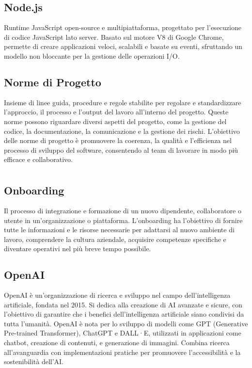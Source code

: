 \subsection*{Node.js}
Runtime JavaScript open-source e multipiattaforma, progettato per l'esecuzione di codice JavaScript lato server. Basato sul motore V8 di Google Chrome, 
permette di creare applicazioni veloci, scalabili e basate su eventi, sfruttando un modello non bloccante per la gestione delle operazioni I/O.

\subsection*{Norme di Progetto}
Insieme di linee guida, procedure e regole stabilite per regolare e standardizzare l’approccio, il processo e l’output del lavoro all’interno del progetto. 
Queste norme possono riguardare diversi aspetti del progetto, come la gestione del codice, la documentazione, la comunicazione e la gestione dei rischi. 
L’obiettivo delle norme di progetto è promuovere la coerenza, la qualità e l’efficienza nel processo di sviluppo del software, consentendo al team di 
lavorare in modo più efficace e collaborativo.

\newpage



\section{}

\hypertarget{sec:onboarding}{}
\subsection*{Onboarding}
Il processo di integrazione e formazione di un nuovo dipendente, collaboratore o utente in un'organizzazione o piattaforma. L'onboarding ha l'obiettivo di 
fornire tutte le informazioni e le risorse necessarie per adattarsi al nuovo ambiente di lavoro, comprendere la cultura aziendale, acquisire competenze 
specifiche e diventare operativi nel più breve tempo possibile. 

\hypertarget{sec:openai}{}
\subsection*{OpenAI}
OpenAI è un'organizzazione di ricerca e sviluppo nel campo dell'intelligenza artificiale, fondata nel 2015. Si dedica alla creazione di AI avanzate e 
sicure, con l'obiettivo di garantire che i benefici dell'intelligenza artificiale siano condivisi da tutta l'umanità. OpenAI è nota per lo sviluppo di 
modelli come GPT (Generative Pre-trained Transformer), ChatGPT e DALL·E, utilizzati in applicazioni come chatbot, creazione di contenuti, e generazione 
di immagini. Combina ricerca all'avanguardia con implementazioni pratiche per promuovere l'accessibilità e la sostenibilità dell'AI.


\newpage